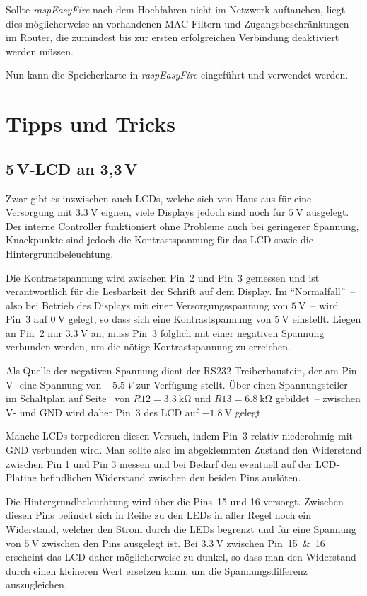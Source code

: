 \documentclass[paper=a4, parskip, numbers=noenddot, toc=listof, headsepline]{scrbook}
\newcommand{\REF}{\emph{raspEasyFire}}
\begin{document}
			Sollte {\REF} nach dem Hochfahren nicht im Netzwerk auftauchen, liegt dies möglicherweise an vorhandenen MAC-Filtern und Zugangsbeschränkungen im Router, die zumindest bis zur ersten erfolgreichen Verbindung deaktiviert werden müssen.

			Nun kann die Speicherkarte in {\REF} eingeführt und verwendet werden.

	\chapter{Tipps und Tricks}

		\section[5V-LCD an 3,3V]{5\,V-LCD an 3,3\,V}

			Zwar gibt es inzwischen auch LCDs, welche sich von Haus aus für eine Versorgung mit $\SI{3,3}{\volt}$ eignen, viele Displays jedoch sind noch für $\SI{5}{\volt}$ ausgelegt. Der interne Controller funktioniert ohne Probleme auch bei geringerer Spannung, Knackpunkte sind jedoch die Kontrastspannung für das LCD sowie die Hintergrundbeleuchtung.

			Die Kontrastspannung wird zwischen Pin~2 und Pin~3 gemessen und ist verantwortlich für die Lesbarkeit der Schrift auf dem Display. Im \enquote{Normalfall}~-- also bei Betrieb des Displays mit einer Versorgungsspannung von $\SI{5}{\volt}$~-- wird Pin~3 auf $\SI{0}{\volt}$ gelegt, so dass sich eine Kontrastspannung von $\SI{5}{\volt}$ einstellt. Liegen an Pin~2 nur $\SI{3,3}{\volt}$ an, muss Pin~3 folglich mit einer negativen Spannung verbunden werden, um die nötige Kontrastspannung zu erreichen.

			Als Quelle der negativen Spannung dient der RS232-Treiberbaustein, der am Pin V- eine Spannung von $\SI{-5,5}{V}$ zur Verfügung stellt. Über einen Spannungsteiler~-- im Schaltplan auf Seite~\pageref{fig:transmitterschematic} von $R12 = \SI{3,3}{\kilo\ohm}$ und $R13 = \SI{6,8}{\kilo\ohm}$ gebildet~-- zwischen V- und GND wird daher Pin~3 des LCD auf $\SI{-1,8}{\volt}$ gelegt.

			Manche LCDs torpedieren diesen Versuch, indem Pin~3 relativ niederohmig mit GND verbunden wird. Man sollte also im abgeklemmten Zustand den Widerstand zwischen Pin 1 und Pin 3 messen und bei Bedarf den eventuell auf der LCD-Platine befindlichen Widerstand zwischen den beiden Pins auslöten.

			Die Hintergrundbeleuchtung wird über die Pins~15 und 16 versorgt. Zwischen diesen Pins befindet sich in Reihe zu den LEDs in aller Regel noch ein Widerstand, welcher den Strom durch die LEDs begrenzt und für eine Spannung von $\SI{5}{\volt}$ zwischen den Pins ausgelegt ist. Bei $\SI{3,3}{\volt}$ zwischen Pin~15~\&~16 erscheint das LCD daher möglicherweise zu dunkel, so dass man den Widerstand durch einen kleineren Wert ersetzen kann, um die Spannungsdifferenz auszugleichen.
\end{document}
